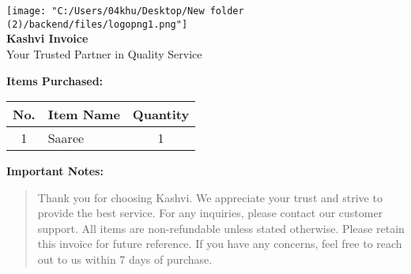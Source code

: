 \documentclass{article}
\begin{document}
        \begin{center}
            \texttt{[image: "C:/Users/04khu/Desktop/New folder (2)/backend/files/logopng1.png"]} \\[0.5em]  
            {\Large \textbf{Kashvi Invoice}} \\[0.5em]
            {\small Your Trusted Partner in Quality Service}
        \end{center}

        \vspace{1em}

        \color{textgray}
        \noindent
        
        \vspace{2em}

        \textbf{Items Purchased:} \\[1em]

        \renewcommand{\arraystretch}{1.3} %
        \begin{tabular}{|c|l|c|}
            \rowcolor{headerblue} %
            \hline
            \textbf{No.} & \textbf{Item Name} & \textbf{Quantity} \\
            \hline
            1 & Saaree & 1 \\ \hline
        \end{tabular}

        \vspace{2em}

        \noindent
        \textbf{Important Notes:} \\[0.5em]
        \begin{quote}
            Thank you for choosing Kashvi. We appreciate your trust and strive to provide the best service.  
            For any inquiries, please contact our customer support.  
            All items are non-refundable unless stated otherwise.  
            Please retain this invoice for future reference.  
            If you have any concerns, feel free to reach out to us within 7 days of purchase.
        \end{quote}
\end{document}
